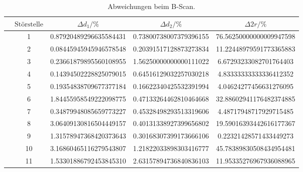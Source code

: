 \begin{table}
        \caption{Abweichungen beim B-Scan.}
        \centering
        \label{tab:diskb}
        \begin{tabular}{l@{}S[round-mode=off, table-format=2.0]S[table-format=1.3, round-precision=2, round-mode=places] S[table-format=1.2, round-precision=2, round-mode=places] S[table-format=2.2, round-precision=2, round-mode=places] } \toprule & {$\text{Störstelle}$}& {$\Delta d_1/\si{\percent}$}& {$\Delta d_2/\si{\percent}$}& {$\Delta 2r/\si{\percent}$}\\\midrule& 1 & 0.87920489296635584431 & 0.73800738007379396155 & 76.56250000000009947598 \\
& 2 & 0.08445945945946578548 & 0.20391517128873273834 & 11.22448979591773365883 \\
& 3 & 0.23661879895560108955 & 1.56250000000000111022 & 6.67293233082701764403 \\
& 4 & 0.14394502228825079015 & 0.64516129032257030218 & 4.83333333333336412352 \\
& 5 & 0.19354838709677377184 & 0.16622340425532391994 & 4.04624277456631276095 \\
& 6 & 1.84455958549222098775 & 0.47133264462810464668 & 32.88602941176482374885 \\
& 7 & 0.34879948085659773227 & 0.45328498293513319606 & 4.48717948717929715485 \\
& 8 & 3.06409130816504449157 & 0.40131338927399656802 & 19.59016393442616177367 \\
& 9 & 1.31578947368420373643 & 0.30168307399173666106 & 0.22321428571433449273 \\
& 10 & 3.16860465116279543807 & 1.21822033898303416777 & 45.78389830508434954481 \\
& 11 & 1.53301886792453845310 & 2.63157894736840836103 & 11.95335276967936088965 \\
 \bottomrule \end{tabular} \end{table}
